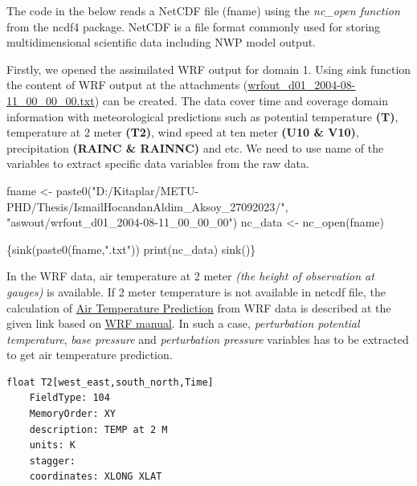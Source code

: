 \documentclass[
  letterpaper,
  DIV=11,
  numbers=noendperiod,
  abstract]{scrartcl}
\newenvironment{Shaded}{\begin{snugshade}}{\end{snugshade}}
\newcommand{\FunctionTok}[1]{\textcolor[rgb]{0.28,0.35,0.67}{#1}}
\newcommand{\NormalTok}[1]{\textcolor[rgb]{0.00,0.23,0.31}{#1}}
\newcommand{\OtherTok}[1]{\textcolor[rgb]{0.00,0.23,0.31}{#1}}
\newcommand{\StringTok}[1]{\textcolor[rgb]{0.13,0.47,0.30}{#1}}
\begin{document}
The code in the below reads a NetCDF file (fname) using the
\emph{nc\_open function} from the ncdf4 package. NetCDF is a file format
commonly used for storing multidimensional scientific data including NWP
model output.

Firstly, we opened the assimilated WRF output for domain 1. Using sink
function the content of WRF output at the attachments
(\href{https://github.com/maksoy88bjk/STAT_570_FINAL_PROJECT_MAKSOY-SAKIL/blob/main/aswout/wrfout_d01_2004-08-11_00_00_00.txt}{wrfout\_d01\_2004-08-11\_00\_00\_00.txt})
can be created. The data cover time and coverage domain information with
meteorological predictions such as potential temperature \textbf{(T)},
temperature at 2 meter \textbf{(T2)}, wind speed at ten meter
\textbf{(U10 \& V10)}, precipitation \textbf{(RAINC \& RAINNC)} and etc.
We need to use name of the variables to extract specific data variables
from the raw data.

\begin{Shaded}
\begin{Highlighting}[]
\NormalTok{fname }\OtherTok{\textless{}{-}} \FunctionTok{paste0}\NormalTok{(}\StringTok{"D:/Kitaplar/METU{-}PHD/Thesis/IsmailHocandanAldim\_Aksoy\_27092023/"}\NormalTok{,}
\StringTok{"aswout/wrfout\_d01\_2004{-}08{-}11\_00\_00\_00"}\NormalTok{)}
\NormalTok{nc\_data }\OtherTok{\textless{}{-}} \FunctionTok{nc\_open}\NormalTok{(fname)}

\NormalTok{\{}\FunctionTok{sink}\NormalTok{(}\FunctionTok{paste0}\NormalTok{(fname,}\StringTok{".txt"}\NormalTok{))}
  \FunctionTok{print}\NormalTok{(nc\_data)}
  \FunctionTok{sink}\NormalTok{()\}}
\end{Highlighting}
\end{Shaded}

In the WRF data, air temperature at 2 meter \emph{(the height of
observation at gauges)} is available. If 2 meter temperature is not
available in netcdf file, the calculation of
\href{http://gradsusr.org/pipermail/gradsusr/2011-December/031698.html}{Air
Temperature Prediction} from WRF data is described at the given link
based on
\href{https://www2.mmm.ucar.edu/wrf/users/docs/user_guide_v4/contents.html}{WRF
manual}. In such a case, \emph{perturbation potential temperature},
\emph{base pressure} and \emph{perturbation pressure} variables has to
be extracted to get air temperature prediction.

\begin{verbatim}
float T2[west_east,south_north,Time]   
    FieldType: 104
    MemoryOrder: XY 
    description: TEMP at 2 M
    units: K
    stagger: 
    coordinates: XLONG XLAT
\end{verbatim}
\end{document}
